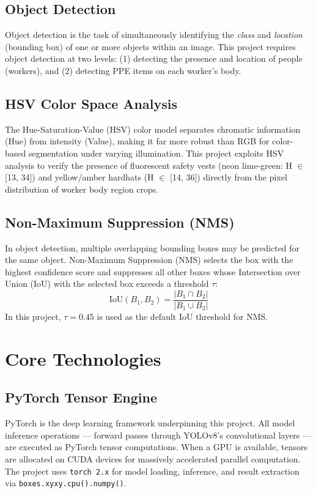 \documentclass[12pt,a4paper]{report}
\begin{document}
\subsection*{Object Detection}
Object detection is the task of simultaneously identifying the \textit{class} and \textit{location} (bounding box) of one or more objects within an image. This project requires object detection at two levels: (1) detecting the presence and location of people (workers), and (2) detecting PPE items on each worker's body.

\subsection*{HSV Color Space Analysis}
The Hue-Saturation-Value (HSV) color model separates chromatic information (Hue) from intensity (Value), making it far more robust than RGB for color-based segmentation under varying illumination. This project exploits HSV analysis to verify the presence of fluorescent safety vests (neon lime-green: H $\in$ [13, 34]) and yellow/amber hardhats (H $\in$ [14, 36]) directly from the pixel distribution of worker body region crops.

\subsection*{Non-Maximum Suppression (NMS)}
In object detection, multiple overlapping bounding boxes may be predicted for the same object. Non-Maximum Suppression (NMS) selects the box with the highest confidence score and suppresses all other boxes whose Intersection over Union (IoU) with the selected box exceeds a threshold $\tau$:
\[
\text{IoU}(B_1, B_2) = \frac{|B_1 \cap B_2|}{|B_1 \cup B_2|}
\]
In this project, $\tau = 0.45$ is used as the default IoU threshold for NMS.

\section{Core Technologies}

\subsection{PyTorch Tensor Engine}
PyTorch is the deep learning framework underpinning this project. All model inference operations — forward passes through YOLOv8's convolutional layers — are executed as PyTorch tensor computations. When a GPU is available, tensors are allocated on CUDA devices for massively accelerated parallel computation. The project uses \texttt{torch 2.x} for model loading, inference, and result extraction via \texttt{boxes.xyxy.cpu().numpy()}.
\end{document}
